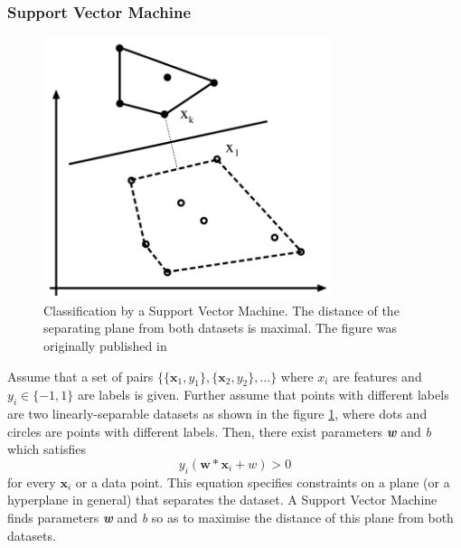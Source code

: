 	
	\subsubsection{Support Vector Machine}
	\begin{figure}[!ht]
	\centering
	\includegraphics[width=0.75\textwidth]{figs/svm}
	\caption{Classification by a Support Vector Machine. The distance of the separating plane from both datasets is maximal. The figure was originally published in \cite{ponce2011cv}}
	\label{fig:svm}
	\end{figure}
	
	Assume that a set of pairs $\{\{\mathbf{x}_1, y_1\}, \{\mathbf{x}_2, y_2\}, ...\}$ where $x_\mathit{i}$ are features and $y_\mathit{i} \in \{-1, 1\}$ are labels is given. Further assume that points with different labels are two linearly-separable datasets as shown in the figure \ref{fig:svm}, where dots and circles are points with different labels. Then, there exist parameters \textbf{\textit{w}} and  \textit{b} which satisfies	
	\begin{equation}
	                        y_\mathit{i}\left(\mathbf{w}*\mathbf{x}_\mathit{i} + w\right) > 0                                                                                                                                                                                                                                                                                                                                                                                                                       
	                                                                                                                                                                                                                                                                                                                                                                                                                                               \end{equation}
	for every $\mathbf{x}_\mathit{i}$ or a data point. This equation specifies constraints on a plane (or a hyperplane in general) that separates the dataset. A Support Vector Machine finds parameters \textbf{\textit{w}} and  \textit{b} so as to maximise the distance of this plane from both datasets.
	
